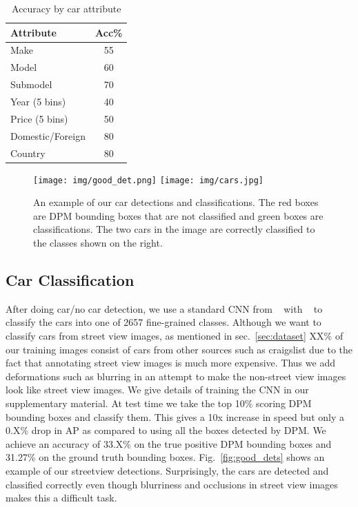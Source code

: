 \documentclass[10pt,twocolumn,letterpaper]{article}
\begin{document}
\begin{table}
\begin{center}
\begin{tabular}{|l|c|}
\hline
\textbf{Attribute} & \textbf{Acc\%} \\
\hline\hline
Make & 55 \\
Model & 60 \\
Submodel & 70 \\
Year (5 bins) & 40 \\
Price (5 bins)& 50 \\
Domestic/Foreign & 80\\
Country & 80\\
\hline
\end{tabular}
\end{center}
\caption{Accuracy by car attribute}
\label{table:tree-acc}
\end{table}

\begin{figure} [t]
\begin{center}
\texttt{[image: img/good\_det.png]}
\raisebox{-0.02\height}
 {
\texttt{[image: img/cars.jpg]}
 }
\end{center}
\caption {An example of our car detections and classifications. The red boxes are DPM bounding boxes that are not classified and green boxes are classifications. The two cars in the image are correctly classified to the classes shown on the right.}
\label{fig:dets}
\end{figure}

\subsection{Car Classification}
After doing car/no car detection, we use a standard CNN from ~\cite{alexnet} with ~\cite{caffe} to classify the cars into one of 2657 fine-grained classes. Although we want to classify cars from street view images, as mentioned in sec.~\ref{sec:dataset} XX\% of our training images consist of cars from other sources such as craigslist due to the fact that annotating street view images is much more expensive. Thus we add deformations such as blurring in an attempt to make the non-street view images look like street view images. We give details of training the CNN in our supplementary material. At test time we take the top 10\% scoring DPM bounding boxes and classify them. This gives a 10x increase in speed but only a 0.X\% drop in AP as compared to using all the boxes detected by DPM. We achieve an accuracy of 33.X\% on the true positive DPM bounding boxes and 31.27\% on the ground truth bounding boxes. Fig.~\ref{fig:good_dets} shows an example of our streetview detections. Surprisingly, the cars are detected and classified correctly even though blurriness and occlusions in street view images makes this a difficult task.
\end{document}
